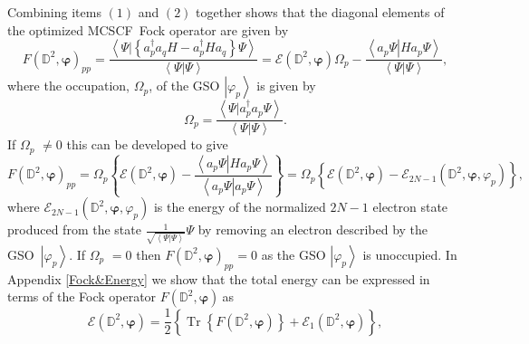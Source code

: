 \documentclass[aps,preprint]{revtex4}%
\begin{document}
Combining items $\left(  1\right)  $ and $\left(  2\right)  $ together shows
that the diagonal elements of the optimized MCSCF\ Fock operator are given by
\begin{equation}
F\left(  \mathbb{D}^{2},\bm{\varphi}\right)  _{pp}=\frac{\left\langle \left.
\Psi\right\vert \left\{  a_{p}^{\dagger}a_{q}H-a_{p}^{\dagger}Ha_{q}\right\}
\Psi\right\rangle }{\left\langle \left.  \Psi\right\vert \Psi\right\rangle
}=\mathcal{E}\left(  \mathbb{D}^{2},\bm{\varphi}\right)  \Omega_{p}%
-\frac{\left\langle \left.  a_{p}\Psi\right\vert Ha_{p}\Psi\right\rangle
}{\left\langle \left.  \Psi\right\vert \Psi\right\rangle },
\end{equation}
where the occupation, $\Omega_{p}$, of the GSO $\left\vert \varphi
_{p}\right\rangle $ is given by
\begin{equation}
\Omega_{p}=\frac{\left\langle \left.  \Psi\right\vert a_{p}^{\dagger}a_{p}%
\Psi\right\rangle }{\left\langle \left.  \Psi\right\vert \Psi\right\rangle }.
\end{equation}
If $\Omega_{p}$ $\neq0$ this can be developed to give
\begin{equation}
F\left(  \mathbb{D}^{2},\bm{\varphi}\right)  _{pp}=\Omega_{p}\left\{
\mathcal{E}\left(  \mathbb{D}^{2},\bm{\varphi}\right)  -\frac{\left\langle
\left.  a_{p}\Psi\right\vert Ha_{p}\Psi\right\rangle }{\left\langle \left.
a_{p}\Psi\right\vert a_{p}\Psi\right\rangle }\right\}  =\Omega_{p}\left\{
\mathcal{E}\left(  \mathbb{D}^{2},\bm{\varphi}\right)  -\mathcal{E}%
_{2N-1}\left(  \mathbb{D}^{2},\bm{\varphi,}\varphi_{p}\right)  \right\}  ,
\end{equation}
where $\mathcal{E}_{2N-1}\left(  \mathbb{D}^{2},\bm{\varphi,}\varphi
_{p}\right)  $ is the energy of the normalized $2N-1$ electron state produced
from the state $\frac{1}{\sqrt{\left\langle \left.  \Psi\right\vert
\Psi\right\rangle }}\Psi$ by removing an electron described by the
GSO\ $\left\vert \varphi_{p}\right\rangle $. If $\Omega_{p}$ $=0$ then
$F\left(  \mathbb{D}^{2},\bm{\varphi}\right)  _{pp}=0$ as the GSO $\left\vert
\varphi_{p}\right\rangle $ is unoccupied. In Appendix \ref{Fock&Energy} we
show that the total energy can be expressed in terms of the Fock operator
$F\left(  \mathbb{D}^{2},\bm{\varphi}\right)  \ $as
\begin{equation}
\mathcal{E}\left(  \mathbb{D}^{2},\bm{\varphi}\right)  =\frac{1}{2}\left\{
\overset{}{\operatorname{Tr}\left\{  F\left(  \mathbb{D}^{2}%
,\bm{\varphi}\right)  \right\}  +\mathcal{E}_{1}\left(  \mathbb{D}%
^{2},\bm{\varphi}\right)  }\right\}  ,
\end{equation}
\end{document}

